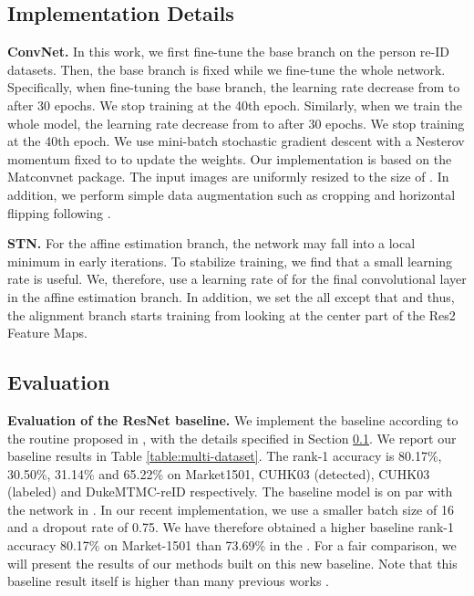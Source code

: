 \subsection{Implementation Details} \label{details}
\textbf{ConvNet.} In this work, we first fine-tune the base branch on the person re-ID datasets. Then, the base branch is fixed while we fine-tune the whole network. Specifically, when fine-tuning the base branch, the learning rate decrease from  to  after 30 epochs. We stop training at the 40th epoch. Similarly, when we train the whole model, the learning rate decrease from  to  after 30 epochs. We stop training at the 40th epoch. We use mini-batch stochastic gradient descent with a Nesterov momentum fixed to  to update the weights. Our implementation is based on the Matconvnet \cite{vedaldi15matconvnet} package. The input images are uniformly resized to the size of . In addition, we perform simple data augmentation such as cropping and horizontal flipping following \cite{zheng2016discriminatively}. 

\textbf{STN.} For the affine estimation branch, the network may fall into a local minimum in early iterations. To stabilize training, we find that a small learning rate is useful. We, therefore, use a learning rate of  for the final convolutional layer in the affine estimation branch. In addition, we set the all  except that  and thus, the alignment branch starts training from looking at the center part of the Res2 Feature Maps. 

\subsection{Evaluation} \label{exp}
\textbf{Evaluation of the ResNet baseline.} We implement the baseline according to the routine proposed in \cite{zheng2016survey}, with the details specified in Section \ref{details}. We report our baseline results in  Table \ref{table:multi-dataset}. The rank-1 accuracy is 80.17\%, 30.50\%, 31.14\% and 65.22\% on Market1501, CUHK03 (detected), CUHK03 (labeled) and DukeMTMC-reID respectively. The baseline model is on par with the network in  \cite{zheng2016discriminatively,zheng2016survey}. In our recent implementation, we use a smaller batch size of 16 and a dropout rate of 0.75. We have therefore obtained a higher baseline rank-1 accuracy 80.17\% on Market-1501 than 73.69\% in the \cite{zheng2016discriminatively,zheng2016survey}. For a fair comparison, we will present the results of our methods built on this new baseline. Note that this baseline result itself is higher than many previous works \cite{barbosa2017looking,varior2016gated,zheng2017pose,zheng2016discriminatively}.

